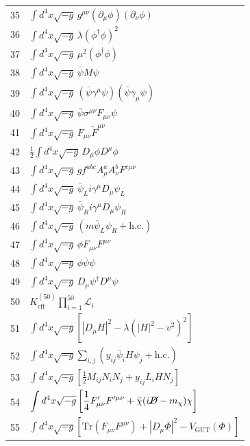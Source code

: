 \documentclass[11pt,a4paper]{article}
\begin{document}
\begin{longtable}{r p{}}
	35 & \(\displaystyle \int d^4x\sqrt{-g}\,g^{\mu\nu}(\partial_\mu\phi)(\partial_\nu\phi)\) \\
	36 & \(\displaystyle \int d^4x\sqrt{-g}\,\lambda(\phi^\dagger\phi)^2\) \\
	37 & \(\displaystyle \int d^4x\sqrt{-g}\,\mu^2(\phi^\dagger\phi)\) \\
	38 & \(\displaystyle \int d^4x\sqrt{-g}\,\bar\psi M\psi\) \\
	39 & \(\displaystyle \int d^4x\sqrt{-g}\,(\bar\psi\gamma^\mu\psi)(\bar\psi\gamma_\mu\psi)\) \\
	40 & \(\displaystyle \int d^4x\sqrt{-g}\,\bar\psi\sigma^{\mu\nu}F_{\mu\nu}\psi\) \\
	41 & \(\displaystyle \int d^4x\sqrt{-g}\,F_{\mu\nu}\tilde{F}^{\mu\nu}\) \\
	42 & \(\displaystyle \frac12\int d^4x\sqrt{-g}\,D_\mu\phi D^\mu\phi\) \\
	43 & \(\displaystyle \int d^4x\sqrt{-g}\,g f^{abc}A^a_\mu A^b_\nu F^{c\mu\nu}\) \\
	44 & \(\displaystyle \int d^4x\sqrt{-g}\,\bar\psi_L i\gamma^\mu D_\mu\psi_L\) \\
	45 & \(\displaystyle \int d^4x\sqrt{-g}\,\bar\psi_R i\gamma^\mu D_\mu\psi_R\) \\
	46 & \(\displaystyle \int d^4x\sqrt{-g}\,(m\bar\psi_L\psi_R + \text{h.c.})\) \\
	47 & \(\displaystyle \int d^4x\sqrt{-g}\,\phi F_{\mu\nu}F^{\mu\nu}\) \\
	48 & \(\displaystyle \int d^4x\sqrt{-g}\,\phi\bar\psi\psi\) \\
	49 & \(\displaystyle \int d^4x\sqrt{-g}\,D_\mu\psi^\dagger D^\mu\psi\) \\
	50 & \(\displaystyle K^{(50)}_{\mathrm{eff}}\prod_{i=1}^{50}\mathcal{L}_i\) \\
	51 & \(\displaystyle \int d^4x\sqrt{-g}\left[|D_\mu H|^2 - \lambda(|H|^2 - v^2)^2\right]\) \\
	52 & \(\displaystyle \int d^4x\sqrt{-g}\sum_{i,j}\left(y_{ij}\bar\psi_i H\psi_j + \text{h.c.}\right)\) \\
	53 & \(\displaystyle \int d^4x\sqrt{-g}\left[\frac12 M_{ij}N_i N_j + y_{ij}L_i H N_j\right]\) \\
	54 & \(\displaystyle \int d^4x\sqrt{-g}\left[\frac14 F'_{\mu\nu}F'^{\mu\nu} + \bar\chi(i\cancel{D} - m_\chi)\chi\right]\) \\
	55 & \(\displaystyle \int d^4x\sqrt{-g}\left[\mathrm{Tr}(F_{\mu\nu}F^{\mu\nu}) + |D_\mu\Phi|^2 - V_{\text{GUT}}(\Phi)\right]\) \\

\end{longtable}
\end{document}
